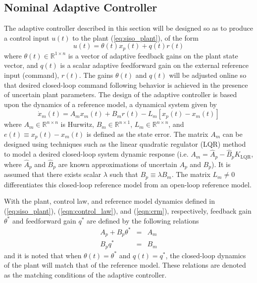 \subsection{Nominal Adaptive Controller}
The adaptive controller described in this section will be designed so as to produce a control input $u(t)$ to the plant (\ref{eq:siso_plant}), of the form
\begin{equation}
	u(t) = \theta(t) x_p(t) + q(t) r(t)
	\label{eqn:control_law}
\end{equation}
\noindent where $\theta(t) \in \mathbb{R}^{1 \times n}$ is a vector of adaptive feedback gains on the plant state vector, and $q(t)$ is a scalar adaptive feedforward gain on the external reference input (command), $r(t)$. The gains $\theta(t)$ and $q(t)$ will be adjusted online so that desired closed-loop command following behavior is achieved in the presence of uncertain plant parameters. The design of the adaptive controller is based upon the dynamics of a reference model, a dynamical system given by
\begin{equation}
	\dot{x}_m(t) = A_m x_m(t) + B_m r(t) - L_m \left[x_p(t) - x_m(t)\right]
	\label{eqn:crm}
\end{equation}
\noindent where $A_m \in \mathbb{R}^{n \times n}$ is Hurwitz, $B_m \in \mathbb{R}^{n \times 1}$, $L_m \in \mathbb{R}^{n \times n}$, and $e(t) \equiv x_p(t) - x_m(t)$ is defined as the state error. The matrix $A_m$ can be designed using techniques such as the linear quadratic regulator (LQR) method to model a desired closed-loop system dynamic response (i.e. $A_m = \hat{A}_p - \hat{B}_p K_{\textrm{LQR}}$, where $\hat{A}_p$ and $\hat{B}_p$ are known approximations of uncertain $A_p$ and $B_p$). It is assumed that there exists scalar $\lambda$ such that $B_p \equiv \lambda B_m$. The matrix $L_m \neq 0$ differentiates this closed-loop reference model from an open-loop reference model. 

With the plant, control law, and reference model dynamics defined in (\ref{eq:siso_plant}), (\ref{eqn:control_law}), and (\ref{eqn:crm}), respectively, feedback gain $\theta^*$ and feedforward gain $q^*$ are defined by the following relations
\begin{eqnarray}
	A_p + B_p \theta^* &=& A_m \label{eqn:matchcond1} \\
	B_p q^* &=& B_m \label{eqn:matchcond2} 
\end{eqnarray}
and it is noted that when $\theta(t) = \theta^*$ and $q(t) = q^*$, the closed-loop dynamics of the plant will match that of the reference model. These relations are denoted as the matching conditions of the adaptive controller.

